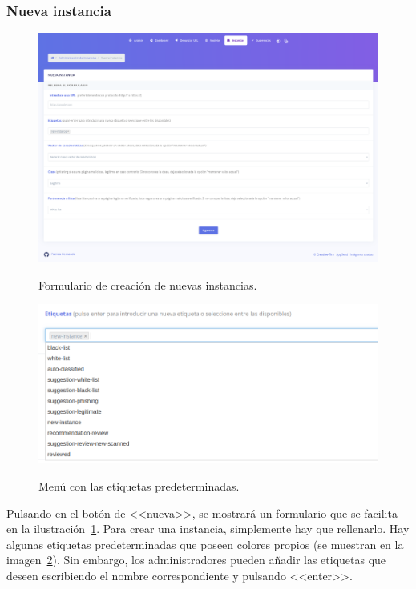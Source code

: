\subsubsection{Nueva instancia}

\begin{figure}[h]
	\caption[Manual de usuario: nueva instancia]{Formulario de creación de nuevas instancias.}
	\centering
	\includegraphics[width=\textwidth]{../img/anexos/user_guide/6_new_instance}
	\label{e-5:new-instance}
\end{figure}

\begin{figure}[h]
	\caption[Manual de usuario: etiquetas predeterminadas]{Menú con las etiquetas predeterminadas.}
	\centering
	\includegraphics[scale=0.3]{../img/anexos/user_guide/6_labels}
	\label{e-6:labels}
\end{figure}

Pulsando en el botón de <<nueva>>, se mostrará un formulario que se facilita en la ilustración~\ref{e-5:new-instance}. Para crear una instancia, simplemente hay que rellenarlo. Hay algunas etiquetas predeterminadas que poseen colores propios (se muestran en la imagen~\ref{e-6:labels}). Sin embargo, los administradores pueden añadir las etiquetas que deseen escribiendo el nombre correspondiente y pulsando <<enter>>.

